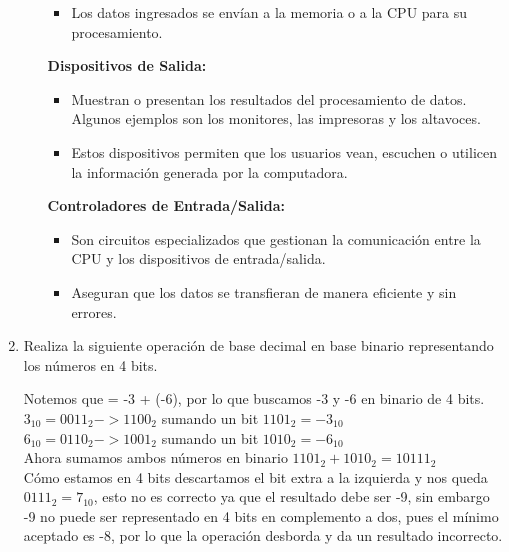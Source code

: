 \documentclass[12pt,letterpaper]{article}
\begin{document}
\begin{enumerate}
\begin{enumerate}[label=\arabic*)]
\begin{itemize}
      \item Los datos ingresados se envían a la memoria o a la CPU para su procesamiento.
      \end{itemize}
      
      \textbf{Dispositivos de Salida:}
      \begin{itemize}
      \item Muestran o presentan los resultados del procesamiento de datos.
        Algunos ejemplos son los monitores, las impresoras y los altavoces.
        
      \item Estos dispositivos permiten que los usuarios vean, escuchen o utilicen la información generada por la computadora.
      \end{itemize}
      
      \textbf{Controladores de Entrada/Salida:}
      \begin{itemize}
      \item Son circuitos especializados que gestionan la comunicación entre la CPU y los dispositivos de entrada/salida.
        
      \item Aseguran que los datos se transfieran de manera eficiente y sin errores.
      \end{itemize}
    \end{enumerate}
    \bigskip
    
  \item Realiza la siguiente operación   de base decimal en base binario representando los números en 4 bits.
    
    \bigskip

    Notemos que   = -3 + (-6), por lo que buscamos -3 y -6 en binario de 4 bits.\\
    $3_{10} = 0011_2 -> 1100_2$ sumando un bit $1101_2 = -3_{10}$\\
    $6_{10} = 0110_2 -> 1001_2$ sumando un bit $1010_2 = -6_{10}$\\
    Ahora sumamos ambos números en binario $1101_2 + 1010_2 = 10111_2$\\
    Cómo estamos en 4 bits descartamos el bit extra a la izquierda y nos queda $0111_2 = 7_{10}$, esto no es correcto ya que el resultado debe ser -9, sin embargo -9 no puede ser representado en 4 bits en complemento a dos, pues el mínimo aceptado es -8, por lo que la operación desborda y da un resultado incorrecto.
    \bigskip
    

\end{enumerate}
\end{document}
